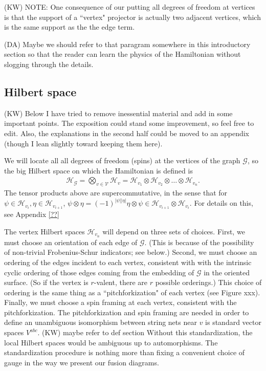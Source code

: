 \documentclass[12pt,a4paper]{article}
\newcommand{\tp}{\otimes}
\newcommand{\mcg}{\mathcal{G}}
\newcommand{\mch}{\mathcal{H}}
\newcommand{\mcv}{\mathcal{V}}
\newcommand{\kw}[1]{{\color{kwcolor}\footnotesize{(KW) #1}}}
\newcommand{\dave}[1]{{\color{ao(english)}\footnotesize{(DA) #1}}}
\newcommand{\ethan}[1]{{\color{amethyst}\footnotesize{(EL) #1}}}
\begin{document}
\kw{NOTE: One consequence of our putting all degrees of freedom at vertices is that the support of a ``vertex" projector is actually two adjacent vertices, 
which is the same support as the the edge term.}

\dave{Maybe we should refer to that paragram somewhere in this introductory section so that the reader can learn the physics of the Hamiltonian without slogging through the details.}


\subsection{Hilbert space} \label{hilbertspacesect}

\kw{Below I have tried to remove inessential material and add in some important points.
The exposition could stand some improvement, so feel free to edit.
Also, the explanations in the second half could be moved to an appendix (though I lean slightly toward keeping them here).}

We will locate all all degrees of freedom (spins) at the vertices of the graph $\mcg$, so
the big Hilbert space on which the Hamiltonian is defined is
\begin{align}	\label{GraphHilbertSpace}
 \mch_\mcg =\bigotimes_{v \in \mcv} \mch_v  = \mch_{v_1} \tp \mch_{v_{2}} \tp \dots \tp \mch_{v_n} .
\end{align}
The tensor products above are supercommutative, in the sense that for $\psi\in \mch_{v_i},\eta\in \mch_{v_{i+1}}$, $\psi \tp \eta = (-1)^{|\psi||\eta|}\eta\tp\psi \in \mch_{v_{i+1}} \tp \mch_{v_i}$. 
For details on this, see Appendix \ref{??}

The vertex Hilbert spaces $\mch_{v_n}$ will depend on three sets of choices.
First, we must choose an orientation of each edge of $\mcg$.
(This is because of the possibility of non-trivial Frobenius-Schur indicators; see below.)
Second, we must choose an ordering of the edges incident to each vertex, consistent with with the intrinsic cyclic ordering of those edges
coming from the embedding of $\mcg$ in the oriented surface.
(So if the vertex is $r$-valent, there are $r$ possible orderings.)
This choice of ordering is the same thing as a ``pitchforkization" of each vertex (see Figure xxx).
Finally, we must choose a spin framing at each vertex, consistent with the pitchforkization.
The pitchforkization and spin framing are needed in order to define an unambiguous
isomorphism between string nets near $v$ is standard vector spaces $V^{abc}$.
\kw{maybe refer to def section}
Without this standardization, the local Hilbert spaces would be ambiguous up to automorphisms. 
The standardization procedure is nothing more than fixing a convenient choice of gauge in the way we present our fusion diagrams. 
\end{document}
